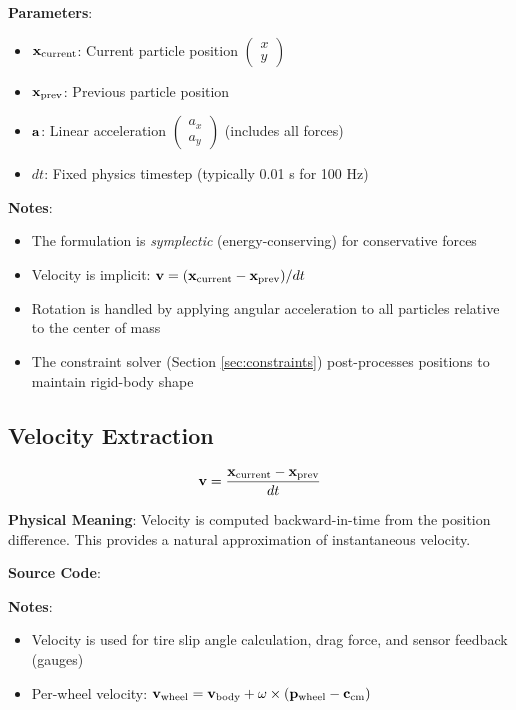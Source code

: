 \textbf{Parameters}:
\begin{itemize}
  \item $\mathbf{x}_{\text{current}}$: Current particle position $\begin{pmatrix} x \\ y \end{pmatrix}$
  \item $\mathbf{x}_{\text{prev}}$: Previous particle position
  \item $\mathbf{a}$: Linear acceleration $\begin{pmatrix} a_x \\ a_y \end{pmatrix}$ (includes all forces)
  \item $dt$: Fixed physics timestep (typically 0.01 s for 100 Hz)
\end{itemize}

\textbf{Notes}:
\begin{itemize}
  \item The formulation is \textit{symplectic} (energy-conserving) for conservative forces
  \item Velocity is implicit: $\mathbf{v} = (\mathbf{x}_{\text{current}} - \mathbf{x}_{\text{prev}}) / dt$
  \item Rotation is handled by applying angular acceleration to all particles relative to the center of mass
  \item The constraint solver (Section \ref{sec:constraints}) post-processes positions to maintain rigid-body shape
\end{itemize}

\subsection{Velocity Extraction}

\begin{equation}
  \mathbf{v} = \frac{\mathbf{x}_{\text{current}} - \mathbf{x}_{\text{prev}}}{dt}
  \label{eq:velocity-extraction}
\end{equation}

\textbf{Physical Meaning}: Velocity is computed backward-in-time from the position difference. This provides a natural approximation of instantaneous velocity.

\textbf{Source Code}: 

\textbf{Notes}:
\begin{itemize}
  \item Velocity is used for tire slip angle calculation, drag force, and sensor feedback (gauges)
  \item Per-wheel velocity: $\mathbf{v}_{\text{wheel}} = \mathbf{v}_{\text{body}} + \omega \times (\mathbf{p}_{\text{wheel}} - \mathbf{c}_{\text{cm}})$
\end{itemize}

